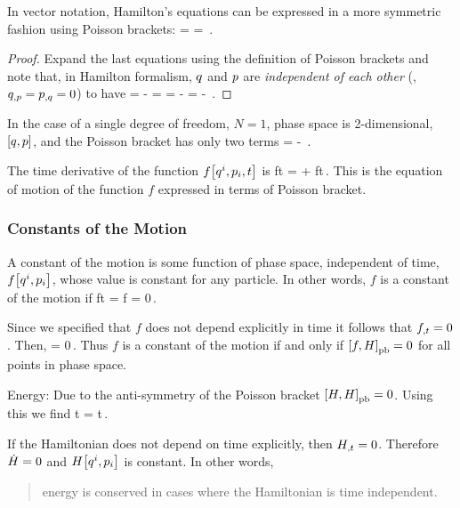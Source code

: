 In vector notation, Hamilton's equations can be expressed in a more symmetric fashion using Poisson brackets:
\beq
\dt\gpvec = \poisson{\gpvec, \ham} \qquad{}\qquad 
 \dt\lmom = \poisson{\lmom, \ham}\,.
\eeq
\begin{proof}
Expand the last equations using the definition of Poisson brackets and note that, in Hamilton formalism, $q$ and $p$ are \emph{independent of each other} (\ie, ${q}_{,{p}} = {p}_{,{q}} = 0$) to have
\beq
\dt\gpvec = \xpd{\gpvec}{\gpvec}\xpd{\ham}{\lmom} - \xpd{\gpvec}{\lmom}\xpd{\ham}{\gpvec} 
          = \xpd{\ham}{\lmom} 
          \qquad{}\qquad 
 \dt\lmom = \xpd{\lmom}{\gpvec}\xpd{\ham}{\lmom} - \xpd{\lmom}{\lmom}\xpd{\ham}{\gpvec} 
          = - \xpd{\ham}{\gpvec} \,.\mqed
\eeq
\end{proof}

In the case of a single degree of freedom, $N = 1$, phase space is 2-dimensional, $\left[{q, p}\right]$, and the Poisson bracket has only two terms
\beq
{} =  - \,.
\eeq

The time derivative of the function $f\!\left[{{q}^{i}, {p}_{i}, t}\right]$ is
\beq
\xod ft =  + \xpd ft\,.
\eeq
This is the equation of motion of the function $f$ expressed in terms of Poisson bracket.


\subsubsection{Constants of the Motion}
A constant of the motion is some function of phase space, independent of time, $f\!\left[{{q}^{i}, {p}_{i}}\right]$, whose value is constant for any particle. In other words, $f$ is a constant of the motion if
\beq
\xod ft = \dt f = 0\,.
\eeq

Since we specified that $f$ does not depend explicitly in time it follows that ${f}_{,{t}} = 0$. Then,
\beq
{} = 0\,.
\eeq
Thus $f$ is a constant of the motion if and only if $\left[{f,H}\right]_{\text{pb}} = 0$ for all points in phase space.

Energy: Due to the anti-symmetry of the Poisson bracket $\left[{H, H}\right]_{\text{pb}} = 0$. Using this we find
\beq
\xod\ham t = \xpd\ham t\,.
\eeq

If the Hamiltonian does not depend on time explicitly, then ${H}_{,{t}} = 0$. Therefore $\dot{H} = 0$ and $H\!\left[{{q}^{i}, {p}_{i}}\right]$ is constant. In other words,
\begin{quote}
energy is conserved in cases where the Hamiltonian is time independent.
\end{quote}

